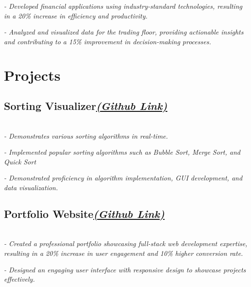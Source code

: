 \documentclass[a4paper,11pt]{article}
\begin{document}
	\hspace{-1.5em}\textsl{- Developed financial applications using industry-standard technologies, resulting in a 20\% increase in efficiency and productivity.}

	\hspace{-1.5em}\textsl{- Analyzed and visualized data for the trading floor, providing actionable insights and contributing to a 15\% improvement in decision-making processes.}
	


	
	\vspace{-1.1em}
	


	\section{Projects}
	
	\subsection{Sorting Visualizer{\hspace{27.5em}}\underline{\textsl{\href{https://github.com/akshaynaresh/Sorting-Visualizer}{(Github Link)}}}}
	
    \textsl{\\- Demonstrates various sorting algorithms in real-time.}
	
	\hspace{-1.5em}\textsl{- Implemented popular sorting algorithms such as Bubble Sort, Merge Sort, and Quick Sort }

	\hspace{-1.5em}\textsl{- Demonstrated proficiency in algorithm implementation, GUI development, and data visualization.}
	
	\subsection{Portfolio Website{\hspace{27.8em}}\underline{\textsl{\href{https://github.com/akshaynaresh/portfolio-website}{(Github Link)}}}}
	
	\textsl{\\- Created a professional portfolio showcasing full-stack web development expertise, resulting in a 20\% increase in user engagement and 10\% higher conversion rate.}
	
	{\hspace{-1.5em}}\textsl{- Designed an engaging user interface with responsive design to showcase projects effectively.}
\end{document}
